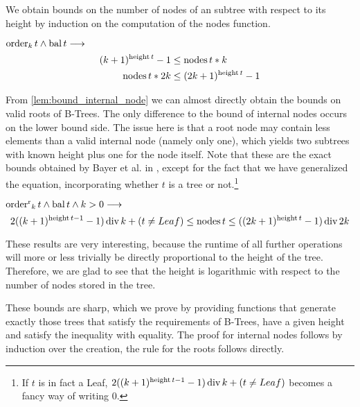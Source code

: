 We obtain bounds
on the number of nodes of an subtree with respect to its height
by induction on the computation of the nodes function.

\begin{lemma}
    \label{lem:bound_internal_node}
    $\operatorname{order}_k t \wedge \operatorname{bal} t \longrightarrow$
    \begin{align}
        (k+1)^{\operatorname{height} t} - 1 &\le \operatorname{nodes} t * k \\
        \operatorname{nodes} t * 2k &\le (2k+1)^{\operatorname{height} t} - 1
    \end{align}
\end{lemma}

From \autoref{lem:bound_internal_node} we can almost directly obtain
the bounds on valid roots of B-Trees.
The only difference to the bound of internal nodes occurs on the lower bound side.
The issue here is that a root node may contain less elements than
a valid internal node (namely only one), which yields two subtrees with known height
plus one for the node itself.
Note that these are the exact bounds obtained by Bayer et al. in \parencite{DBLP:journals/acta/BayerM72},
except for the fact that we have generalized the equation,
incorporating whether $t$ is a tree or not.\footnote{
    If $t$ is in fact a Leaf,
    $2((k+1)^{\operatorname{height} t - 1} - 1) \operatorname{div} k + (t \neq Leaf)$ becomes a fancy way of writing $0$.
}

\begin{theorem}
    $\operatorname{order^r}_k t \wedge \operatorname{bal} t \wedge k > 0 \longrightarrow$
    \begin{equation}
        2((k+1)^{\operatorname{height} t - 1} - 1) \operatorname{div} k + (t \neq Leaf) \le \operatorname{nodes} t \le ((2k+1)^{\operatorname{height} t} - 1) \operatorname{div} 2k
    \end{equation}
\end{theorem}

These results are very interesting, because
the runtime of all further operations will more or less trivially be
directly proportional to the height of the tree.
Therefore, we are glad to see that the height is logarithmic
with respect to the number of nodes stored in the tree.

These bounds are sharp, which we prove by providing 
functions that generate exactly those trees
that satisfy the requirements of B-Trees, have a given height
and satisfy the inequality with equality.
The proof for internal nodes follows by induction over the creation,
the rule for the roots follows directly.

